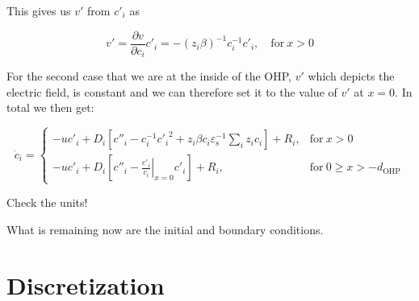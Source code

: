 \documentclass[10pt,a4paper]{article}
\begin{document}
This gives us $v'$ from $c'_i$ as

\begin{equation}
v' = \frac{\partial v}{\partial c_i} c'_i = -\left(z_i \beta\right)^{-1} c_i^{-1} c'_i, \quad \mathrm{for}~ x > 0
\end{equation}

For the second case that we are at the inside of the OHP, $v'$ which depicts the electric field, is constant and we can therefore set it to the value of $v'$ at $x=0$. In total we then get:

\begin{equation}
\dot{c}_i =\left.
\begin{cases}
-u c'_i + D_i \left[c''_i - c_i^{-1} {c'_i}^2 + z_i \beta c_i \varepsilon_\mathrm{s}^{-1} \sum\limits_i z_i c_i\right] + R_i,& \mathrm{for}~ x > 0\\
-u c'_i + D_i \left[c''_i - \left.\frac{c'_i}{c_i}\right|_{x=0} c'_i\right] + R_i, & \mathrm{for}~ 0 \geq x > -d_\mathrm{OHP}
\end{cases}
\right.
\end{equation}

Check the units!

What is remaining now are the initial and boundary conditions.

\section{Discretization}
\end{document}
